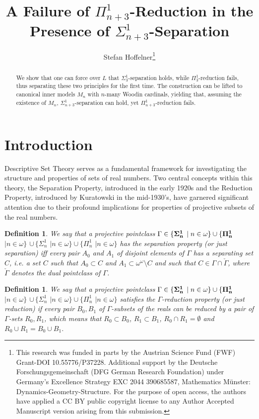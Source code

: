 \documentclass[a4paper,11pt]{article}
\title{A Failure of $\Pi^1_{n+3}$-Reduction in the Presence of $\Sigma^1_{n+3}$-Separation}
\author{ Stefan Hoffelner\footnote{This research was funded in parts by the Austrian Science Fund (FWF) Grant-DOI 10.55776/P37228. Additional support by the Deutsche Forschungsgemeinschaft (DFG German Research Foundation) under Germany's Excellence Strategy EXC 2044 390685587, Mathematics M\"unster: Dynamics-Geometry-Structure. For the purpose of open access, the authors have applied a CC BY public copyright license to any Author Accepted Manuscript version arising from this submission.}  }
\newtheorem{definition}[theorem]{Definition}
\begin{document}
\maketitle

\begin{abstract}
We show that one can force over $L$ that $\Sigma^1_3$-separation holds, while $\Pi^1_3$-reduction fails, thus separating these two principles for the first time. The construction can be lifted to canonical inner models $M_n$ with $n$-many Woodin cardinals, yielding that, assuming the existence of $M_n$,  $\Sigma^1_{n+3}$-separation can hold, yet $\Pi^1_{n+3}$-reduction fails.
\end{abstract}

\section{Introduction}

Descriptive Set Theory serves as a fundamental framework for investigating the structure and properties of sets of real numbers. Two central concepts within this theory, the Separation Property, introduced in the early 1920s and the Reduction Property, introduced by Kuratowski in the mid-1930's, have garnered significant attention due to their profound implications for properties of projective subsets of the real numbers.

\begin{definition}
 We say that a projective pointclass $\Gamma \in \{ \bf{\Sigma}^1_n$ $ \mid n \in \omega\} \cup \{\bf{\Pi}^1_n$ $ \mid n \in \omega \}$ $\cup \,\{ {\Sigma}^1_n$ $ \mid n \in \omega\} \cup \{{\Pi}^1_n$ $ \mid n \in \omega \}$ has the separation 
 property (or just separation) iff every pair $A_0$ and $A_1$ of disjoint elements of  $\Gamma$ has a separating set $C$, i.e. a set $C$ such that $A_0 \subset C$ and $A_1 \subset \omega^{\omega} \setminus C$ and such that $C
   \in \Gamma \cap \check{\Gamma}$, where  $\check{\Gamma}$ denotes the dual pointclass of $\Gamma$.
\end{definition}

\begin{definition}
We say that a projective pointclass $\Gamma \in \{ \bf{\Sigma}^1_n$ $ \mid n \in \omega\} \cup \{\bf{\Pi}^1_n$ $ \mid n \in \omega \}$ $\cup \, \{ {\Sigma}^1_n$ $ \mid n \in \omega\} \cup \{{\Pi}^1_n$ $ \mid n \in \omega \}$ satisfies the $\Gamma$-reduction property (or just reduction) if every pair $B_0,B_1$ of $\Gamma$-subsets of the reals can be reduced by a pair of $\Gamma$-sets $R_0,R_1$, which means that $R_0 \subset B_0$, $R_1 \subset B_1$, $R_0 \cap R_1= \emptyset$ and $R_0 \cup R_1=B_0 \cup B_1$.
\end{definition}
\end{document}
